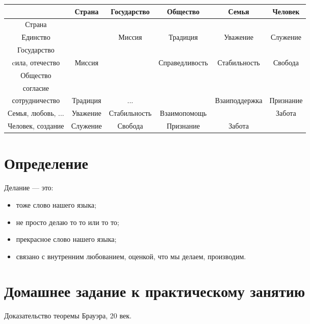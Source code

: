 \documentclass{article}
\begin{document}
\begin{tabular}{c|c|c|c|c|c}
                               ~   &   Страна &  Государство & Общество       & Семья         & Человек \\
    \hline
                Страна \\ Единство   &        ~ &       Миссия &     Традиция   & Уважение      & Служение \\
    \hline
    Государство \\ cила, отечество & Миссия & ~            & Справедливость & Стабильность  & Свобода   \\
    \hline
    Общество \\ согласие \\ сотрудничество   & Традиция &          ... & ~              & Взаиподдержка & Признание \\
    \hline
              Семья, любовь, ...   & Уважение & Стабильность & Взаимопомощь   & ~             & Забота    \\
    \hline
               Человек, создание   & Служение &      Свобода & Признание      & Забота & ~ 
\end{tabular}


\section{Определение}
Делание --- это:
\begin{itemize}
    \item тоже слово нашего языка;
    \item не просто делаю то то или то то; 
    \item прекрасное слово нашего языка;
    \item связано с внутренним любованием, оценкой, что мы делаем, производим.
\end{itemize}



\section{Домашнее задание к практическому занятию}
Доказательство теоремы Брауэра, 20 век.
\end{document}
